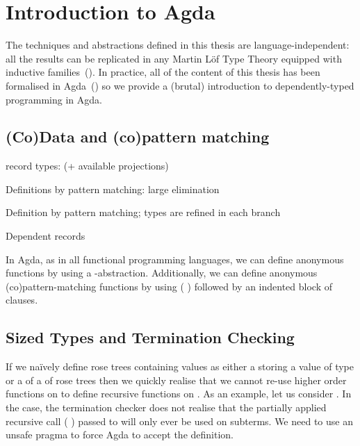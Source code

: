 \chapter{Introduction to Agda}

The techniques and abstractions defined in this thesis are language-independent: all the
results can be replicated in any Martin L\"of Type Theory equipped with inductive
families~(\cite{dybjer1994inductive}). In practice, all of the content of this thesis
has been formalised in Agda~(\cite{norell2009dependently}) so we provide a (brutal)
introduction to dependently-typed programming in Agda.

\section{(Co)Data and (co)pattern matching}


record types: (+ available projections)


Definitions by pattern matching: large elimination



Definition by pattern matching; types are refined in each branch


Dependent records


In Agda, as in all functional programming languages, we can define anonymous functions
by using a -abstraction. Additionally, we can define anonymous (co)pattern-matching
functions by using ( ) followed by an indented block of clauses.



\section{Sized Types and Termination Checking}

If we naïvely define rose trees containing  values as either a  storing
a value of type  or a  of a  of rose trees then we quickly
realise that we cannot re-use higher order functions on  to define recursive
functions on . As an example, let us consider .
In the  case, the termination checker does not realise that the partially
applied recursive call ( ) passed to
 will only ever be used on subterms. We need to use
an unsafe  pragma to force Agda to accept the definition.

